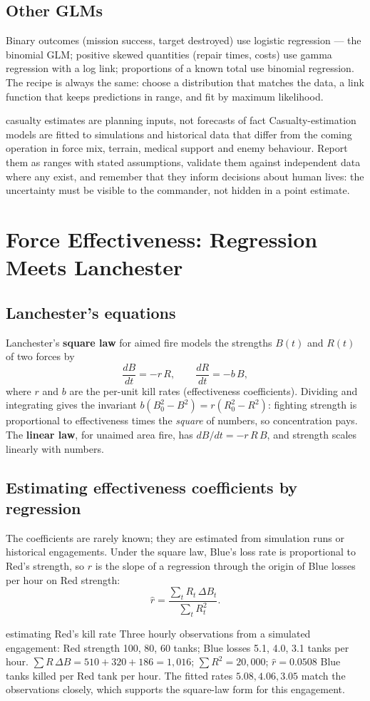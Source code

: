 \documentclass[11pt]{article}
\begin{document}
\subsection{Other GLMs}
Binary outcomes (mission success, target destroyed) use logistic regression --- the binomial GLM; positive skewed quantities (repair times, costs) use gamma regression with a log link; proportions of a known total use binomial regression. The recipe is always the same: choose a distribution that matches the data, a link function that keeps predictions in range, and fit by maximum likelihood.
\begin{pitfall}{casualty estimates are planning inputs, not forecasts of fact}
Casualty-estimation models are fitted to simulations and historical data that differ from the coming operation in force mix, terrain, medical support and enemy behaviour. Report them as ranges with stated assumptions, validate them against independent data where any exist, and remember that they inform decisions about human lives: the uncertainty must be visible to the commander, not hidden in a point estimate.
\end{pitfall}

\section{Force Effectiveness: Regression Meets Lanchester}
\subsection{Lanchester's equations}
Lanchester's \textbf{square law} for aimed fire models the strengths $B(t)$ and $R(t)$ of two forces by
\[\frac{dB}{dt}=-r\,R,\qquad\frac{dR}{dt}=-b\,B,\]
where $r$ and $b$ are the per-unit kill rates (effectiveness coefficients). Dividing and integrating gives the invariant $b(B_0^2-B^2)=r(R_0^2-R^2)$: fighting strength is proportional to effectiveness times the \emph{square} of numbers, so concentration pays. The \textbf{linear law}, for unaimed area fire, has $dB/dt=-r\,R\,B$, and strength scales linearly with numbers.
\subsection{Estimating effectiveness coefficients by regression}
The coefficients are rarely known; they are estimated from simulation runs or historical engagements. Under the square law, Blue's loss rate is proportional to Red's strength, so $r$ is the slope of a regression through the origin of Blue losses per hour on Red strength:
\[\hat r=\frac{\sum_tR_t\,\Delta B_t}{\sum_tR_t^2}.\]
\begin{example}{estimating Red's kill rate}
Three hourly observations from a simulated engagement: Red strength 100, 80, 60 tanks; Blue losses 5.1, 4.0, 3.1 tanks per hour. $\sum R\,\Delta B=510+320+186=1{,}016$; $\sum R^2=20{,}000$; $\hat r=0.0508$ Blue tanks killed per Red tank per hour. The fitted rates $5.08,4.06,3.05$ match the observations closely, which supports the square-law form for this engagement.
\end{example}
\end{document}
